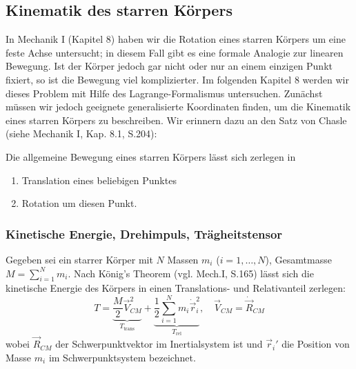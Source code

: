 \documentclass[10pt, letterpaper]{article}
\begin{document}
\subsection{Kinematik des starren Körpers}


In Mechanik I (Kapitel 8) haben wir die Rotation eines starren Körpers um eine feste Achse untersucht; in diesem Fall gibt es eine formale Analogie zur linearen Bewegung. Ist der Körper jedoch gar nicht oder nur an einem einzigen Punkt fixiert, so ist die Bewegung viel komplizierter. Im folgenden Kapitel 8 werden wir dieses Problem mit Hilfe des Lagrange-Formalismus untersuchen. Zunächst müssen wir jedoch geeignete generalisierte Koordinaten finden, um die Kinematik eines starren Körpers zu beschreiben. Wir erinnern dazu an den Satz von Chasle (siehe Mechanik I, Kap. 8.1, S.204):

Die allgemeine Bewegung eines starren Körpers lässt sich zerlegen in
\begin{enumerate}
\item Translation eines beliebigen Punktes
\item Rotation um diesen Punkt.
\end{enumerate}

\subsubsection{Kinetische Energie, Drehimpuls, Trägheitstensor}


Gegeben sei ein starrer Körper mit $N$ Massen $m_i$ ($i = 1,\dots,N$), Gesamtmasse $M = \sum_{i=1}^N m_i$. Nach König’s Theorem (vgl. Mech.I, S.165) lässt sich die kinetische Energie des Körpers in einen Translations- und Relativanteil zerlegen:
\[
T = \underbrace{\frac{M}{2} \vec{V}_{CM}^2}_{T_{\text{trans}}} + \underbrace{\frac{1}{2} \sum_{i=1}^N m_i \dot{\vec{r}}_i^2}_{T_{\text{rel}}}, \quad \vec{V}_{CM} = \dot{\vec{R}}_{CM}
\]
wobei $\vec{R}_{CM}$ der Schwerpunktvektor im Inertialsystem ist und $\vec{r}_i'$ die Position von Masse $m_i$ im Schwerpunktsystem bezeichnet.
\end{document}

